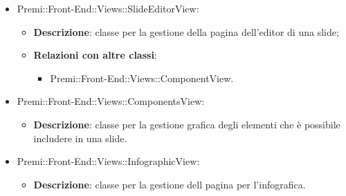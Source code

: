 \begin{itemize}
	\item Premi::Front-End::Views::SlideEditorView:
	\begin{itemize}
		\item \textbf{Descrizione}: classe per la gestione della pagina dell'editor di una \gls{slide};
		\item \textbf{Relazioni con altre classi}:
		\begin{itemize}
			\item Premi::Front-End::Views::ComponentView.
		\end{itemize}
	\end{itemize}

	\item Premi::Front-End::Views::ComponentsView:
	\begin{itemize}
		\item \textbf{Descrizione}: classe per la gestione grafica degli elementi che è possibile includere in una \gls{slide}.
	\end{itemize}

	\item Premi::Front-End::Views::InfographicView:
	\begin{itemize}
		\item \textbf{Descrizione}: classe per la gestione dell pagina per l'\gls{infografica}.
	\end{itemize}

\end{itemize}
